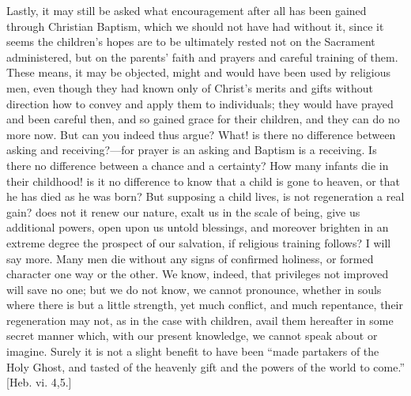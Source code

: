 Lastly, it may still be asked what encouragement after all has been
gained through Christian Baptism, which we should not have had without
it, since it seems the children's hopes are to be ultimately rested
not on the Sacrament administered, but on the parents' faith and
prayers and careful training of them. These means, it may be objected,
might and would have been used by religious men, even though they had
known only of Christ's merits and gifts without direction how to
convey and apply them to individuals; they would have prayed and been
careful then, and so gained grace for their children, and they can do
no more now. But can you indeed thus argue? What! is there no
difference between asking and receiving?—for prayer is an asking and
Baptism is a receiving. Is there no difference between a chance and a
certainty? How many infants die in their childhood! is it no
difference to know that a child is gone to heaven, or that he has died
as he was born? But supposing a child lives, is not regeneration a
real gain? does not it renew our nature, exalt us in the scale of
being, give us additional powers, open upon us untold blessings, and
moreover brighten in an extreme degree the prospect of our salvation,
if religious training follows? I will say more. Many men die without
any signs of confirmed holiness, or formed character one way or the
other. We know, indeed, that privileges not improved will save no one;
but we do not know, we cannot pronounce, whether in souls where there
is but a little strength, yet much conflict, and much repentance,
their regeneration may not, as in the case with children, avail them
hereafter in some secret manner which, with our present knowledge, we
cannot speak about or imagine. Surely it is not a slight benefit to
have been ``made partakers of the Holy Ghost, and tasted of the
heavenly gift and the powers of the world to come.'' [Heb. vi.
4,5.]

